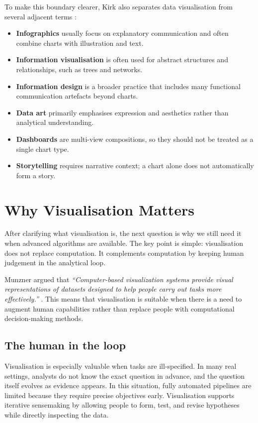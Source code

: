 To make this boundary clearer, Kirk also separates data visualisation from several adjacent terms \parencite[pp.~27--29]{kirk2019}:
\begin{itemize}
    \item \textbf{Infographics} usually focus on explanatory communication and often combine charts with illustration and text.
    \item \textbf{Information visualisation} is often used for abstract structures and relationships, such as trees and networks.
    \item \textbf{Information design} is a broader practice that includes many functional communication artefacts beyond charts.
    \item \textbf{Data art} primarily emphasises expression and aesthetics rather than analytical understanding.
    \item \textbf{Dashboards} are multi-view compositions, so they should not be treated as a single chart type.
    \item \textbf{Storytelling} requires narrative context; a chart alone does not automatically form a story.
\end{itemize}

\section{Why Visualisation Matters}
\label{sec:why-visualisation}
\noindent After clarifying what visualisation is, the next question is why we still need it when advanced algorithms are available. The key point is simple: visualisation does not replace computation. It complements computation by keeping human judgement in the analytical loop.

Munzner argued that \textit{``Computer-based visualization systems provide visual representations of datasets designed to help people carry out tasks more effectively.''} \parencite{munzner2014}. This means that visualisation is suitable when there is a need to augment human capabilities rather than replace people with computational decision-making methods.

\subsection*{The human in the loop}
Visualisation is especially valuable when tasks are ill-specified. In many real settings, analysts do not know the exact question in advance, and the question itself evolves as evidence appears. In this situation, fully automated pipelines are limited because they require precise objectives early. Visualisation supports iterative sensemaking by allowing people to form, test, and revise hypotheses while directly inspecting the data.

